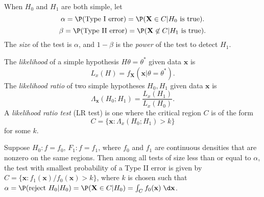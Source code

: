 \documentclass[a4paper]{article}
\begin{document}
\begin{defi}
When $H_0$ and $H_1$ are both simple, let
\[
  \alpha = \P(\text{Type I error}) = \P(\mathbf{X}\in C|H_0\text{ is true}).
\]
\[
  \beta = \P(\text{Type II error}) = \P(\mathbf{X}\not\in C|H_1\text{ is true}).
\]
The \emph{size} of the test is $\alpha$, and $1 - \beta$ is the \emph{power} of the test to detect $H_1$.
\end{defi}

\begin{defi}[Likelihood]
  The \emph{likelihood} of a simple hypothesis $H\theta = \theta^*$ given data $\mathbf{x}$ is
  \[
    L_x(H) = f_\mathbf{X}(\mathbf{x}|\theta = \theta^*).
  \]
  The \emph{likelihood ratio} of two simple hypotheses $H_0, H_1$ given data $\mathbf{x}$ is
  \[
    \Lambda_\mathbf{x}(H_0; H_1) = \frac{L_x(H_1)}{L_x(H_0)}.
  \]
  A \emph{likelihood ratio test} (LR test) is one where the critical region $C$ is of the form
  \[
    C = \{\mathbf{x}: \Lambda_x (H_0; H_1) > k\}
  \]
  for some $k$.
\end{defi}

\begin{lemma}
  Suppose $H_0: f = f_0$, $F_1: f = f_1$, where $f_0$ and $f_1$ are continuous densities that are nonzero on the same regions. Then among all tests of size less than or equal to $\alpha$, the test with smallest probability of a Type II error is given by $C = \{\mathbf{x}: f_1(\mathbf{x})/f_0(\mathbf{x}) > k\}$, where $k$ is chosen such that $\alpha=\P(\text{reject }H_0|H_0) = \P(\mathbf{X}\in C| H_0) = \int_C f_0(\mathbf{x})\;\d \mathbf{x}$.
\end{lemma}
\end{document}
